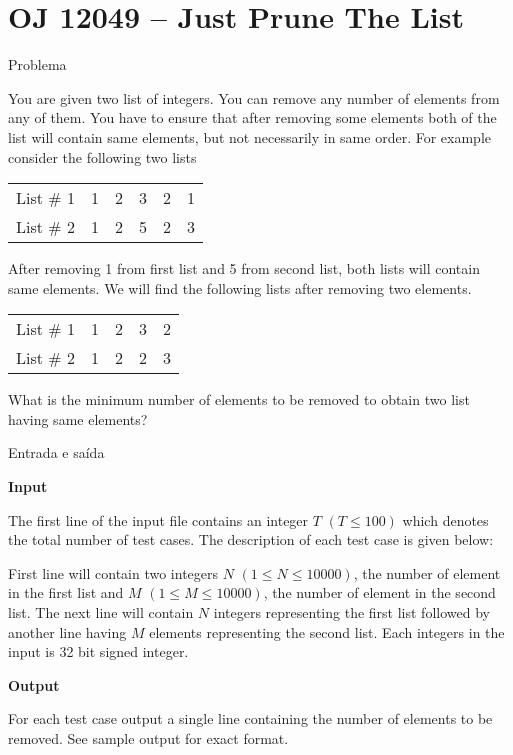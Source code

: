 \section{OJ 12049 -- Just Prune The List}

\begin{frame}[fragile]{Problema}

You are given two list of integers. You can remove any number of elements from any of them. You
have to ensure that after removing some elements both of the list will contain same elements, but not
necessarily in same order. For example consider the following two lists
\begin{table}[h]
    \centering
    \begin{tabular}{|l|ccccc|}
    \hline
    List \# 1 & 1 & 2 & 3 & 2 & 1 \\
    List \# 2 & 1 & 2 & 5 & 2 & 3 \\
    \hline
    \end{tabular}
\end{table}

After removing 1 from first list and 5 from second list, both lists will contain same elements. We
will find the following lists after removing two elements.
\begin{table}[h]
    \centering
    \begin{tabular}{|l|cccc|}
    \hline
    List \# 1 & 1 & 2 & 3 & 2 \\
    List \# 2 & 1 & 2 & 2 & 3 \\
    \hline
    \end{tabular}
\end{table}

What is the minimum number of elements to be removed to obtain two list having same elements?
\end{frame}

\begin{frame}[fragile]{Entrada e saída}

\textbf{Input}

The first line of the input file contains an integer $T$ $(T\leq 100)$ which denotes the total 
number of test cases. The description of each test case is given below:

First line will contain two integers $N$ $(1 \leq N \leq 10000)$, the number of element in the 
first list and $M$ $(1\leq M\leq 10000)$, the number of element in the second list. The next line 
will contain $N$ integers
representing the first list followed by another line having $M$ elements representing the second list. Each integers in the input is 32 bit signed integer.

\textbf{Output}

For each test case output a single line containing the number of elements to be removed. See sample
output for exact format.
\end{frame}



